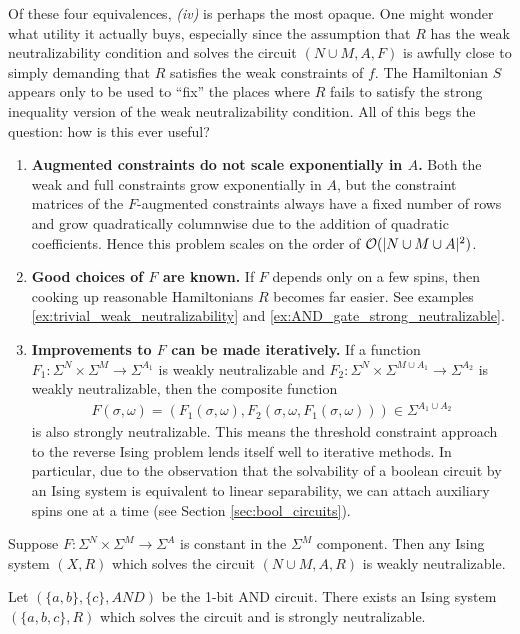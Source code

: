 \documentclass{article}
\begin{document}
\begin{rmk}
  Of these four equivalences, \emph{(iv)} is perhaps the most opaque. One might wonder what utility it actually buys, especially since the assumption that $R$ has the weak neutralizability condition and solves the circuit $(N\cup M, A, F)$ is awfully close to simply demanding that $R$ satisfies the weak constraints of $f$. The Hamiltonian $S$ appears only to be used to ``fix'' the places where $R$ fails to satisfy the strong inequality version of the weak neutralizability condition. All of this begs the question: how is this ever useful?

  \begin{enumerate}
    \item \textbf{Augmented constraints do not scale exponentially in $A$.} Both the weak and full constraints grow exponentially in $A$, but the constraint matrices of the $F$-augmented constraints always have a fixed number of rows and grow quadratically columnwise due to the addition of quadratic coefficients. Hence this problem scales on the order of $\mathcal{O}(|N \cup M \cup A|^2)$.
    \item \textbf{Good choices of $F$ are known.} If $F$ depends only on a few spins, then cooking up reasonable Hamiltonians $R$ becomes far easier. See examples \ref{ex:trivial_weak_neutralizability} and \ref{ex:AND_gate_strong_neutralizable}.
    \item \textbf{Improvements to $F$ can be made iteratively.} If a function $F_1:\Sigma^N \times \Sigma^M \to \Sigma^{A_1}$ is weakly neutralizable and $F_2:\Sigma^N\times \Sigma^{M\cup A_1} \to \Sigma^{A_2}$ is weakly neutralizable, then the composite function
      \begin{align*}
        F(\sigma, \omega) = (F_1(\sigma, \omega), F_2(\sigma, \omega, F_1(\sigma, \omega))) \in \Sigma^{A_1 \cup A_2}
      \end{align*}
      is also strongly neutralizable. This means the threshold constraint approach to the reverse Ising problem lends itself well to iterative methods. In particular, due to the observation that the solvability of a boolean circuit by an Ising system is equivalent to linear separability, we can attach auxiliary spins one at a time (see Section \ref{sec:bool_circuits}).
  \end{enumerate}
\end{rmk}

\begin{example}\label{ex:trivial_weak_neutralizability}
  Suppose $F:\Sigma^N \times \Sigma^M \to \Sigma^A$ is constant in the $\Sigma^M$ component. Then any Ising system $(X, R)$ which solves the circuit $(N\cup M, A, R)$ is weakly neutralizable.
\end{example}
\begin{example}\label{ex:AND_gate_strong_neutralizable}
  Let $(\{a,b\}, \{c\}, AND)$ be the 1-bit AND circuit. There exists an Ising system $(\{a,b,c\}, R)$ which solves the circuit and is strongly neutralizable.
\end{example}
\end{document}
